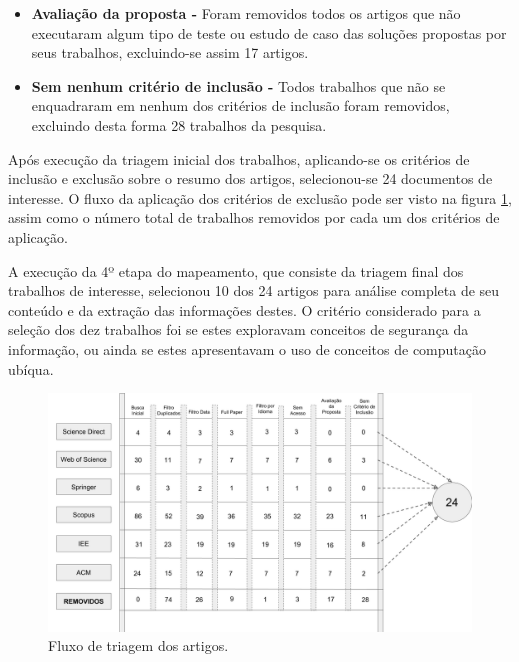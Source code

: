 \documentclass[ti,table]{texufpel} %
\begin{document}
\begin{itemize}
\item  \textbf{Avaliação da proposta - } Foram removidos todos os artigos que não executaram algum tipo de teste ou estudo de caso das soluções propostas por seus trabalhos, excluindo-se assim 17 artigos. 

  

\item  \textbf{Sem nenhum critério de inclusão - } Todos trabalhos que não  se enquadraram em nenhum dos critérios de inclusão foram removidos, excluindo desta forma 28 trabalhos da pesquisa. 

     

  

\end{itemize} 

  

  

Após execução da triagem inicial dos trabalhos, aplicando-se os critérios de inclusão e exclusão sobre o resumo dos artigos, selecionou-se 24 documentos de interesse. O fluxo da aplicação dos critérios de exclusão pode ser visto na figura \ref{fig:grafFluxoTriagemInicial}, assim como o número total de trabalhos removidos por cada um dos critérios de aplicação.  

  

A execução da 4º etapa do mapeamento, que consiste da triagem final dos trabalhos de interesse, selecionou 10 dos 24 artigos para análise completa de seu conteúdo e da extração das informações destes. O critério considerado para a seleção dos dez trabalhos foi se estes exploravam conceitos de segurança da informação, ou ainda se estes apresentavam o uso de conceitos de computação ubíqua.  

  

  

\begin{landscape} 

\begin{figure}[ht] 

    \centering 

    \includegraphics[width=1.7\textwidth]{imagens/FluxoTriagemInicial.png} 

    \caption{Fluxo de triagem dos artigos.} 

    \label{fig:grafFluxoTriagemInicial} 

\end{figure} 

\end{landscape} 
\end{document}
